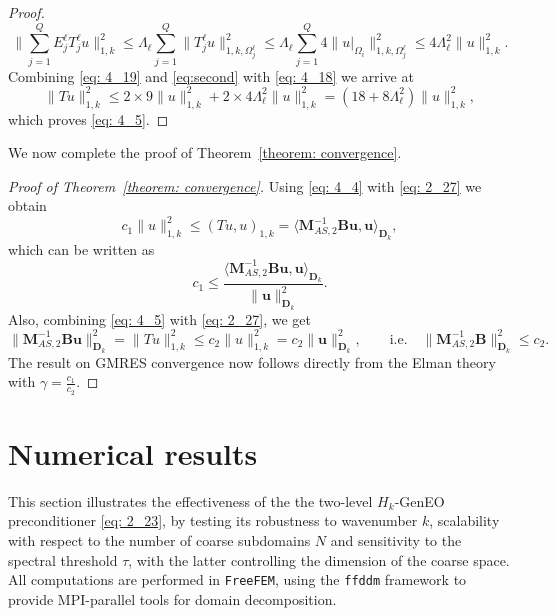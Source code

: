 \documentclass[numbers,webpdf,imaiai]{ima-authoring-template}%
\theoremstyle{thmstyletwo}%
\numberwithin{equation}{section}
\numberwithin{equation}{section}
\begin{document}
{\begin{proof}
\begin{equation}
	\label{eq:second}
	\Bigg\|\sum_{j=1}^{Q} E^{\ell}_j T^{\ell}_j u\Bigg\|_{1,k}^2 
	\le \Lambda_{\ell} \sum_{j=1}^{Q} \|T^{\ell}_j u\|_{1,k,\Omega^{\ell}_j}^2 
	\le \Lambda_{\ell} \sum_{j=1}^{Q} 4\big\|u|_{\Omega_i}\big\|_{1,k,\Omega^{\ell}_j}^2 
	\le 4 \Lambda_{\ell}^2\|u\|_{1,k}^2. 
\end{equation}
Combining \eqref{eq: 4_19} and \eqref{eq:second} with \eqref{eq: 4_18} we arrive at
\begin{equation*}
	\|Tu\|_{1,k}^2 \le 2\times9\|u\|_{1,k}^2 + 2\times4 \Lambda_{\ell}^2\|u\|_{1,k}^2 
	= (18 + 8\Lambda_{\ell}^2)\|u\|^2_{1,k},
\end{equation*}
which proves \eqref{eq: 4_5}.
\end{proof}

We now complete the proof of Theorem~\ref{theorem: convergence}.

\begin{proof}[Proof of Theorem~\ref{theorem: convergence}]
Using \eqref{eq: 4_4} with \eqref{eq: 2_27} we obtain
\begin{equation*}
	c_1 \|u\|_{1,k}^2 \le (Tu,u)_{1,k} = \bigl\langle \mathbf{M}_{AS,2}^{-1}\mathbf{B}\mathbf{u},\mathbf{u}\bigr\rangle_{\mathbf{D}_{k}},
\end{equation*}
which can be written as 
\begin{equation*}
	c_1 \le \frac{\bigl\langle\mathbf{M}_{AS,2}^{-1}\mathbf{B}\mathbf{u},\mathbf{u}\bigr\rangle_{\mathbf{D}_{k}}}{\|\mathbf{u}\|_{\mathbf{D}_{k}}^2 }.
\end{equation*}
Also, combining \eqref{eq: 4_5} with \eqref{eq: 2_27}, we get
\begin{equation*}
	\|\mathbf{M}_{AS,2}^{-1}\mathbf{B}\mathbf{u}\|_{\mathbf{D}_{k}}^2 
	= \|Tu\|_{1,k}^2 
	\le c_2\|u\|_{1,k}^2 = c_2\|\mathbf{u}\|^2_{\mathbf{D}_{k}},
	\qquad \text{i.e.} \quad 
	\|\mathbf{M}_{AS,2}^{-1}\mathbf{B}\|_{\mathbf{D}_k}^2 \le c_2.
\end{equation*}
The result on GMRES convergence now follows directly from the Elman theory \cite{Elman:1983:VIM}
with $\gamma=\frac{c_1}{c_2}$. 
\end{proof}

\section{Numerical results}
\label{sec:numerics}

This section illustrates the effectiveness of the the two-level $H_k$-GenEO preconditioner \eqref{eq: 2_23}, 
by testing its robustness to wavenumber $k$, scalability with respect to the number of coarse subdomains $N$ 
and sensitivity to the spectral threshold $\tau$, with the latter controlling  the dimension of the coarse space. 
All computations are performed in \texttt{FreeFEM}, using the \texttt{ffddm} framework to provide MPI-parallel tools for domain decomposition. 

}
\end{document}
